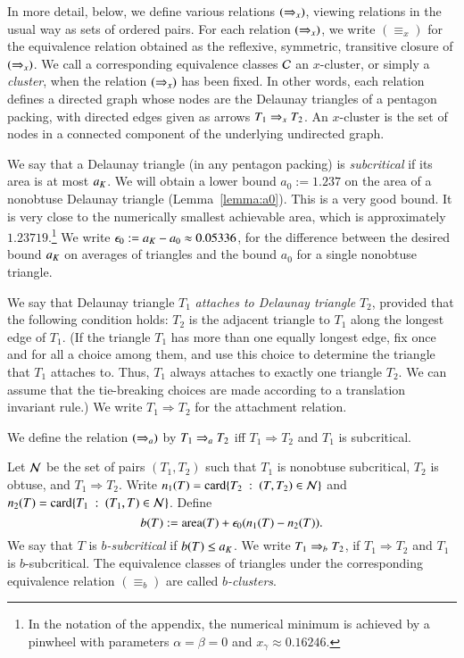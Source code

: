 In more detail, below, we define various relations $(\Rightarrow_{x})$, viewing
relations in the usual way as sets of ordered pairs.  For each
relation $(\Rightarrow_{x})$, we write ${(\equiv_{x})}$ for the equivalence
relation obtained as the reflexive, symmetric, transitive closure of
$(\Rightarrow_{x})$.  We call a corresponding equivalence classes $\mathcal C$ an
$x$-cluster, or simply a {\it cluster}, when the relation $(\Rightarrow_{x})$
has been fixed.  In other words, each relation defines a directed
graph whose nodes are the Delaunay triangles of a pentagon packing,
with directed edges given as arrows $T_1\Rightarrow_{x} T_2$.  An $x$-cluster
is the set of nodes in a connected component of the underlying
undirected graph.

We say that a Delaunay triangle (in any pentagon packing) is {\it
  subcritical} if its area is at most $a_K$.  We will obtain a lower
bound $a_0 := 1.237$ on the area of a nonobtuse Delaunay triangle
(Lemma~\ref{lemma:a0}).  This is a very good bound.  It is very close
to the numerically smallest achievable area, which is approximately
$1.23719$.\footnote{In the notation of the appendix, the numerical 
minimum is achieved by a pinwheel with parameters $\alpha=\beta=0$
and $x_\gamma\approx 0.16246$.}  
We write $\epsilon_0 := a_K - a_0 \approx 0.05336$, for the
difference between the desired bound $a_K$ on averages of triangles
and the bound $a_0$ for a single nonobtuse triangle.

We say that Delaunay triangle $T_1$ {\it attaches to Delaunay
  triangle} $T_2$, provided that the following condition holds: $T_2$
is the adjacent triangle to $T_1$ along the longest edge of $T_1$.
(If the triangle $T_1$ has more than one equally longest edge, fix
once and for all a choice among them, and use this choice to determine
the triangle that $T_1$ attaches to.  Thus, $T_1$ always attaches to
exactly one triangle $T_2$.  We can assume that the tie-breaking
choices are made according to a translation invariant rule.)  We write
$T_1 \Rightarrow T_2$ for the attachment relation.


We define the relation $(\Rightarrow_{a})$ by $T_1 \Rightarrow_{a} T_2$ iff
$T_1\Rightarrow T_2$ and $T_1$ is subcritical.

Let $\mathcal N$ be the set of pairs $(T_1,T_2)$ such that $T_1$ is nonobtuse
subcritical, $T_2$ is obtuse, and $T_1\Rightarrow T_2$.  Write $n_1(T)
= {\operatorname{card}} \{T_2\ :\  (T,T_2)\in \mathcal N\}$ and $n_2(T) = {\operatorname{card}} \{T_1\ :\ 
(T_1,T)\in \mathcal N\}$.  Define
\[
b(T) := {\operatorname{area}}(T) + \epsilon_0 (n_1(T) - n_2(T)).
\]
We say that $T$ is {\it $b$-subcritical} if $b(T) \le a_K$.  We write
$T_1\Rightarrow_{b} T_2$, if $T_1\Rightarrow T_2$ and $T_1$ is $b$-subcritical.
The equivalence classes of triangles under the corresponding
equivalence relation $(\equiv_b)$ are called {\it $b$-clusters}.

